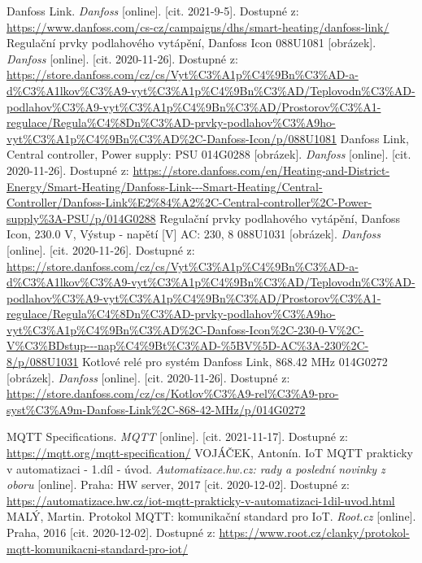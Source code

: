\begin{thebibliography}{3}
Danfoss Link. \textit{Danfoss} [online]. [cit. 2021-9-5]. Dostupné z: \url{https://www.danfoss.com/cs-cz/campaigns/dhs/smart-heating/danfoss-link/}
Regulační prvky podlahového vytápění, Danfoss Icon 088U1081 [obrázek]. \textit{Danfoss} [online]. [cit. 2020-11-26]. Dostupné z: \url{https://store.danfoss.com/cz/cs/Vyt\%C3\%A1p\%C4\%9Bn\%C3\%AD-a-d\%C3\%A1lkov\%C3\%A9-vyt\%C3\%A1p\%C4\%9Bn\%C3\%AD/Teplovodn\%C3\%AD-podlahov\%C3\%A9-vyt\%C3\%A1p\%C4\%9Bn\%C3\%AD/Prostorov\%C3\%A1-regulace/Regula\%C4\%8Dn\%C3\%AD-prvky-podlahov\%C3\%A9ho-vyt\%C3\%A1p\%C4\%9Bn\%C3\%AD\%2C-Danfoss-Icon/p/088U1081}
Danfoss Link, Central controller, Power supply: PSU 014G0288 [obrázek]. \textit{Danfoss} [online]. [cit. 2020-11-26]. Dostupné z: \url{https://store.danfoss.com/en/Heating-and-District-Energy/Smart-Heating/Danfoss-Link---Smart-Heating/Central-Controller/Danfoss-Link\%E2\%84\%A2\%2C-Central-controller\%2C-Power-supply\%3A-PSU/p/014G0288}
Regulační prvky podlahového vytápění, Danfoss Icon, 230.0 V, Výstup - napětí [V] AC: 230, 8 088U1031 [obrázek]. \textit{Danfoss} [online]. [cit. 2020-11-26]. Dostupné z: \url{https://store.danfoss.com/cz/cs/Vyt\%C3\%A1p\%C4\%9Bn\%C3\%AD-a-d\%C3\%A1lkov\%C3\%A9-vyt\%C3\%A1p\%C4\%9Bn\%C3\%AD/Teplovodn\%C3\%AD-podlahov\%C3\%A9-vyt\%C3\%A1p\%C4\%9Bn\%C3\%AD/Prostorov\%C3\%A1-regulace/Regula\%C4\%8Dn\%C3\%AD-prvky-podlahov\%C3\%A9ho-vyt\%C3\%A1p\%C4\%9Bn\%C3\%AD\%2C-Danfoss-Icon\%2C-230-0-V\%2C-V\%C3\%BDstup---nap\%C4\%9Bt\%C3\%AD-\%5BV\%5D-AC\%3A-230\%2C-8/p/088U1031}
Kotlové relé pro systém Danfoss Link, 868.42 MHz 014G0272 [obrázek]. \textit{Danfoss} [online]. [cit. 2020-11-26]. Dostupné z: \url{https://store.danfoss.com/cz/cs/Kotlov\%C3\%A9-rel\%C3\%A9-pro-syst\%C3\%A9m-Danfoss-Link\%2C-868-42-MHz/p/014G0272}

MQTT Specifications. \textit{MQTT} [online]. [cit. 2021-11-17]. Dostupné z: \url{https://mqtt.org/mqtt-specification/}
VOJÁČEK, Antonín. IoT MQTT prakticky v automatizaci - 1.díl - úvod. \textit{Automatizace.hw.cz: rady a poslední novinky z oboru} [online]. Praha: HW server, 2017 [cit. 2020-12-02]. Dostupné z: \url{https://automatizace.hw.cz/iot-mqtt-prakticky-v-automatizaci-1dil-uvod.html}
MALÝ, Martin. Protokol MQTT: komunikační standard pro IoT. \textit{Root.cz} [online]. Praha, 2016 [cit. 2020-12-02]. Dostupné z: \url{https://www.root.cz/clanky/protokol-mqtt-komunikacni-standard-pro-iot/}


\end{thebibliography}
